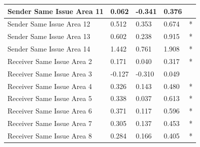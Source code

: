 \documentclass[headsepline=true, abstracton]{scrartcl}
\begin{document}
\begin{table}[H]
\begin{tabular}{|
>{\columncolor[HTML]{EFEFEF}}l |l|l|l|l|}
Sender Same Issue Area 11              & 0.062                            & -0.341                              & 0.376                               &                                      \\ \hline
Sender Same Issue Area 12              & 0.512                            & 0.353                               & 0.674                               & *                                    \\ \hline
Sender Same Issue Area 13              & 0.602                            & 0.238                               & 0.915                               & *                                    \\ \hline
Sender Same Issue Area 14              & 1.442                            & 0.761                               & 1.908                               &  *                                    \\ \hline
Receiver Same Issue Area 2             & 0.171                            & 0.040                               & 0.317                               & *                                    \\ \hline
Receiver Same Issue Area 3             & -0.127                           & -0.310                              & 0.049                               &                                      \\ \hline
Receiver Same Issue Area 4             & 0.326                            & 0.143                               & 0.480                               & *                                    \\ \hline
Receiver Same Issue Area 5             & 0.338                            & 0.037                               & 0.613                               & *                                    \\ \hline
Receiver Same Issue Area 6             & 0.371                            & 0.117                               & 0.596                               & *                                    \\ \hline
Receiver Same Issue Area 7             & 0.305                            & 0.137                               & 0.453                               & *                                    \\ \hline
Receiver Same Issue Area 8             & 0.284                            & 0.166                               & 0.405                               & *                                    \\ \hline

\end{tabular}
\end{table}
\end{document}
